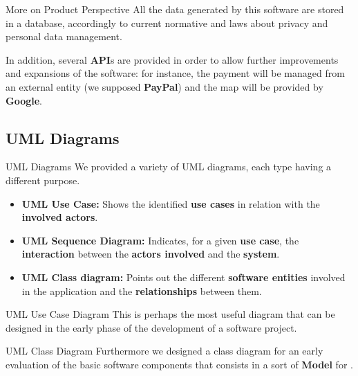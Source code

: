 \documentclass{../Common/Structure/pdf_presentation}
\begin{document}
	\begin{frame}{More on Product Perspective}
		All the data generated by this software are stored in a database, accordingly to current normative and laws about privacy and personal data management.\par
		In addition, several \textbf{API}s are provided in order to allow further improvements and expansions of the software: for instance, the payment will be managed from an external entity (we supposed \textbf{PayPal}) and the map will be provided by \textbf{Google}.
	\end{frame}
	\subsection{UML Diagrams}
	\begin{frame}{UML Diagrams}
		We provided a variety of UML diagrams, each type having a different purpose.
		\begin{itemize}
			\item\textbf{UML Use Case:} Shows the identified \textbf{use cases} in relation with the \textbf{involved actors}.
			\item\textbf{UML Sequence Diagram:} Indicates, for a given \textbf{use case}, the \textbf{interaction} between the \textbf{actors involved} and the \textbf{system}.
			\item\textbf{UML Class diagram:} Points out the different \textbf{software entities} involved in the application and the \textbf{relationships} between them.
		\end{itemize}
	\end{frame}
	\begin{frame}{UML Use Case Diagram}
		This is perhaps the most useful diagram that can be designed in the early phase of the development of a software project.
	\end{frame}
	\begin{frame}{UML Class Diagram}
		Furthermore we designed a class diagram for an early evaluation of the basic software components that consists in a sort of \textbf{Model} for \PowerEnJoy{}.
	\end{frame}
\end{document}
